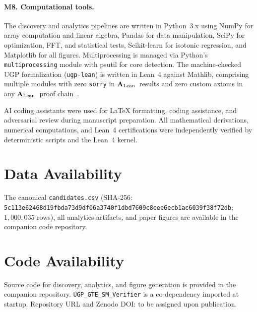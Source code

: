 \documentclass[12pt]{article}
\numberwithin{equation}{section}
\newcommand{\CatAL}{\ensuremath{\textbf{A}_{\rm Lean}}}
\begin{document}
\paragraph{M8. Computational tools.}
The discovery and analytics pipelines are written in Python~3.x using NumPy for array computation and linear algebra, Pandas for data manipulation, SciPy for optimization, FFT, and statistical tests, Scikit-learn for isotonic regression, and Matplotlib for all figures. Multiprocessing is managed via Python's \texttt{multiprocessing} module with psutil for core detection. The machine-checked UGP formalization (\texttt{ugp-lean}) is written in Lean~4 against Mathlib, comprising multiple modules with zero \texttt{sorry} in \CatAL\ results and zero custom axioms in any \CatAL\ proof chain~\cite{ugp-lean}.

AI coding assistants were used for LaTeX formatting, coding assistance, and adversarial review during manuscript preparation. All mathematical derivations, numerical computations, and Lean~4 certifications were independently verified by deterministic scripts and the Lean~4 kernel.

\section*{Data Availability}
The canonical \texttt{candidates.csv} (SHA-256: \texttt{5c113e62\allowbreak 468d19fb\allowbreak da73d9df\allowbreak 06a3740f\allowbreak 1dbd7609\allowbreak c8eee6ec\allowbreak b1ac6039\allowbreak f38f72db}; $1{,}000{,}035$ rows), all analytics artifacts, and paper figures are available in the companion code repository.

\section*{Code Availability}
Source code for discovery, analytics, and figure generation is provided in the companion repository. \texttt{UGP\_GTE\_SM\_Verifier} is a co-dependency imported at startup. Repository URL and Zenodo DOI: to be assigned upon publication.



\end{document}
